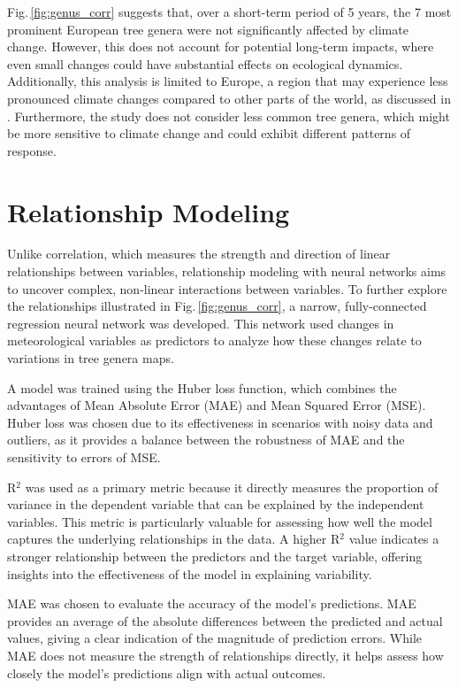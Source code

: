Fig.\,\ref{fig:genus_corr} suggests that, over a short-term period of 5 years, the 7 most prominent European tree genera were not significantly affected by climate change. However, this does not account for potential long-term impacts, where even small changes could have substantial effects on ecological dynamics. Additionally, this analysis is limited to Europe, a region that may experience less pronounced climate changes compared to other parts of the world, as discussed in \cite{hoegh2018climate}. Furthermore, the study does not consider less common tree genera, which might be more sensitive to climate change and could exhibit different patterns of response.

\section{Relationship Modeling}

Unlike correlation, which measures the strength and direction of linear relationships between variables, relationship modeling with neural networks aims to uncover complex, non-linear interactions between variables. To further explore the relationships illustrated in Fig.\,\ref{fig:genus_corr}, a narrow, fully-connected regression neural network was developed. This network used changes in meteorological variables as predictors to analyze how these changes relate to variations in tree genera maps.

A model was trained using the Huber loss function, which combines the advantages of Mean Absolute Error (MAE) and Mean Squared Error (MSE). Huber loss was chosen due to its effectiveness in scenarios with noisy data and outliers, as it provides a balance between the robustness of MAE and the sensitivity to errors of MSE. 

R$^2$ was used as a primary metric because it directly measures the proportion of variance in the dependent variable that can be explained by the independent variables. This metric is particularly valuable for assessing how well the model captures the underlying relationships in the data. A higher R$^2$ value indicates a stronger relationship between the predictors and the target variable, offering insights into the effectiveness of the model in explaining variability.

MAE was chosen to evaluate the accuracy of the model's predictions. MAE provides an average of the absolute differences between the predicted and actual values, giving a clear indication of the magnitude of prediction errors. While MAE does not measure the strength of relationships directly, it helps assess how closely the model's predictions align with actual outcomes.


